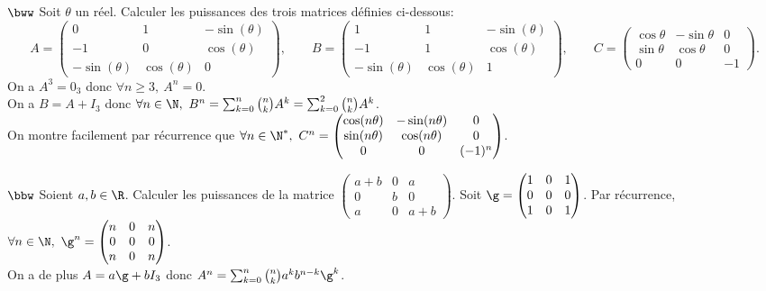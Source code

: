 \documentclass[11pt]{article}
\begin{document}
\begin{exercice}{$\bww$}{}
    Soit $\theta$ un réel. Calculer les puissances des trois matrices définies ci-dessous:
    \begin{equation*}
        A=\begin{pmatrix}
            0&1&-\sin(\theta)\\
            -1&0&\cos(\theta)\\
            -\sin(\theta)&\cos(\theta)&0
        \end{pmatrix}, \qquad B = \begin{pmatrix}
            1 & 1 & -\sin(\theta)\\
            -1 & 1 & \cos(\theta)\\
            -\sin(\theta) & \cos(\theta) & 1
        \end{pmatrix}, \qquad C = \begin{pmatrix}
            \cos \theta & -\sin \theta & 0\\
            \sin \theta & \cos \theta & 0\\
            0 & 0 & -1
        \end{pmatrix}.
    \end{equation*}
    \tcblower
     On a $A^3=0_3$ donc $\forall n \geq 3, ~ A^n=0$.\\
     On a $B=A+I_3$ donc $\forall n \in \N, ~ B^n=\sum_{k=0}^n\binom{n}{k}A^k=\sum_{k=0}^2\binom{n}{k}A^k$.\\
     On montre facilement par récurrence que $\forall n \in \N^*, ~ C^n=\begin{pmatrix}\cos(n\theta)&-\sin(n\theta)&0\\\sin(n\theta)&\cos(n\theta)&0\\0&0&(-1)^n\end{pmatrix}$.
\end{exercice}

\begin{exercice}{$\bbw$}{}
    Soient $a,b\in\R$. Calculer les puissances de la matrice $\begin{pmatrix}a+b&0&a\\0&b&0\\a&0&a+b\end{pmatrix}$.
    \tcblower
    Soit $\g = \begin{pmatrix}1&0&1\\0&0&0\\1&0&1\end{pmatrix}$. Par récurrence, $\forall n \in \N, ~ \g^n=\begin{pmatrix}n&0&n\\0&0&0\\n&0&n\end{pmatrix}$.\\
    On a de plus $A=a\g+bI_3$ donc $A^n=\sum_{k=0}^n\binom{n}{k}a^kb^{n-k}\g^k$. 
\end{exercice}
\end{document}
